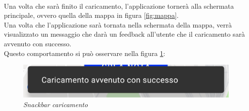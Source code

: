 \\Una volta che sarà finito il caricamento, l'applicazione tornerà alla schermata principale, ovvero quella della mappa in figura \ref{fig:mappa}.
\\Una volta che l'applicazione sarà tornata nella schermata della mappa, verrà visualizzato un messaggio che darà un feedback all'utente che il caricamento sarà avvenuto con successo.
\\Questo comportamento si può osservare nella figura \ref{fig:snackcaricamento}:
\begin{figure}[!h]
    \centering
	\includegraphics[scale=0.3]{Tesi/images/SnackCaricamento}
	\caption{\textit{Snackbar caricamento}}
	\label{fig:snackcaricamento}
\end{figure}

